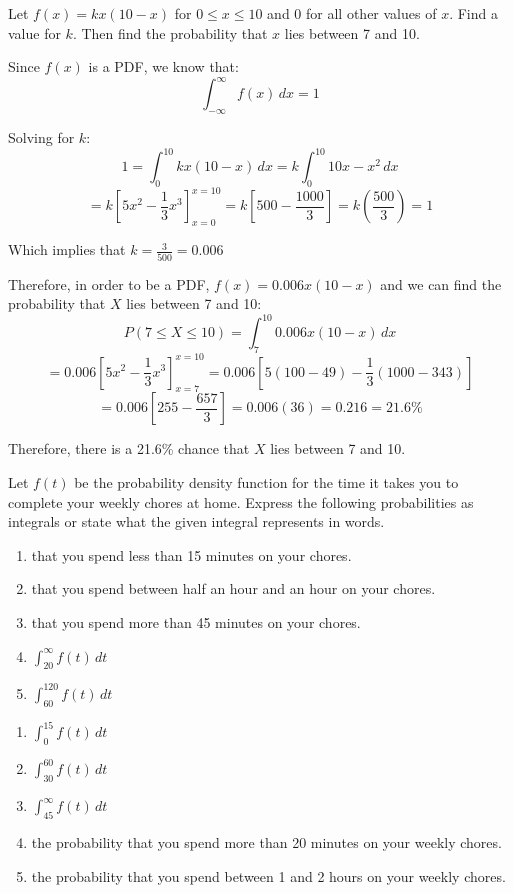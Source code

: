 \begin{Worked}
\begin{Problem}
Let $f(x) = kx(10-x)$ for $0 \leq x \leq 10$ and $0$ for all 
other values of $x$. Find a value for $k$. Then find the probability that $x$ 
lies between 7 and 10. 
\end{Problem}
\begin{Solution}
Since $f(x)$ is a PDF, we know that:
$$\int_{-\infty}^{\infty} f(x)\,dx = 1$$

Solving for $k$:
$$1 = \int_{0}^{10} kx(10-x)\,dx = k\int_0^{10} 10x - x^2\,dx$$
$$= k \left[5x^2 - \frac{1}{3}x^3 \right]_{x = 0}^{x = 10} = k\left[500 - 
\frac{1000}{3} \right] = k \left( \frac{500}{3} \right) = 1$$

Which implies that $k = \frac{3}{500} = 0.006$

Therefore, in order to be a PDF, $f(x) = 0.006x(10-x)$ and we can find the 
probability that $X$ lies between 7 and 10:
$$P(7 \leq X \leq 10) = \int_7^{10} 0.006x(10 - x)\,dx$$
$$= 0.006 \left[5x^2 - \frac{1}{3}x^3 \right]_{x = 7}^{x = 10} = 0.006 \left[ 
5 \left(100 - 49 \right) - \frac{1}{3} \left(1000 - 343 \right) \right]$$
$$= 0.006 \left[ 255 - \frac{657}{3} \right] = 0.006(36) = 0.216 = 21.6\%$$

Therefore, there is a 21.6\% chance that $X$ lies between 7 and 10. 
\end{Solution}
\end{Worked}

\begin{Exercise}[title = {Representing Probabilities as Integrals}, 
label = rep_int]
Let $f(t)$ be the probability density function for the time it takes you to 
complete your weekly chores at home. Express the following probabilities as 
integrals or state what the given integral represents in words. 
\begin{enumerate}
\item that you spend less than 15 minutes on your chores.
\item that you spend between half an hour and an hour on your chores.
\item that you spend more than 45 minutes on your chores. 
\item $\int_{20}^{\infty} f(t)\,dt$
\item $\int_{60}^{120} f(t)\,dt$
\end{enumerate}
\end{Exercise}

\begin{Answer}[ref = rep_int]
\begin{enumerate}
\item $\int_0^{15} f(t)\,dt$
\item $\int_{30}^{60} f(t)\,dt$
\item $\int_{45}^{\infty} f(t)\,dt$
\item the probability that you spend more than 20 minutes on your weekly 
chores.
\item the probability that you spend between 1 and 2 hours on your weekly 
chores.
\end{enumerate}
\end{Answer}

